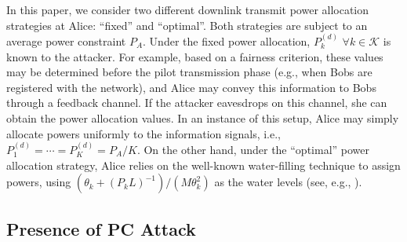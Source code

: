 \documentclass[draftclsnofoot, 12pt, onecolumn, journal]{IEEEtran}
\begin{document}
In this paper, we consider two different downlink transmit power allocation strategies at Alice: ``fixed'' and ``optimal''.
Both strategies are subject to an average power constraint $P_A$.
Under the fixed power allocation, $P_k^{(d)}$ $\forall k \in \mathcal{K}$ is known to the attacker.
For example, based on a fairness criterion, these values may be determined before the pilot transmission phase (e.g., when Bobs are registered with the network), and Alice may convey this information to Bobs through a feedback channel.
If the attacker eavesdrops on this channel, she can obtain the power allocation values.
In an instance of this setup, Alice may simply allocate powers uniformly to the information signals, i.e., $ P_1^{(d)} = \cdots = P_K^{(d)} = P_A / K $.
On the other hand, under the ``optimal'' power allocation strategy, Alice relies on the well-known water-filling technique to assign powers, using $(\theta_k + (P_k L)^{-1}) / (M \theta_k^2)$ as the water levels (see, e.g., \cite{Tse2005}).

\subsection{Presence of PC Attack}
\end{document}
